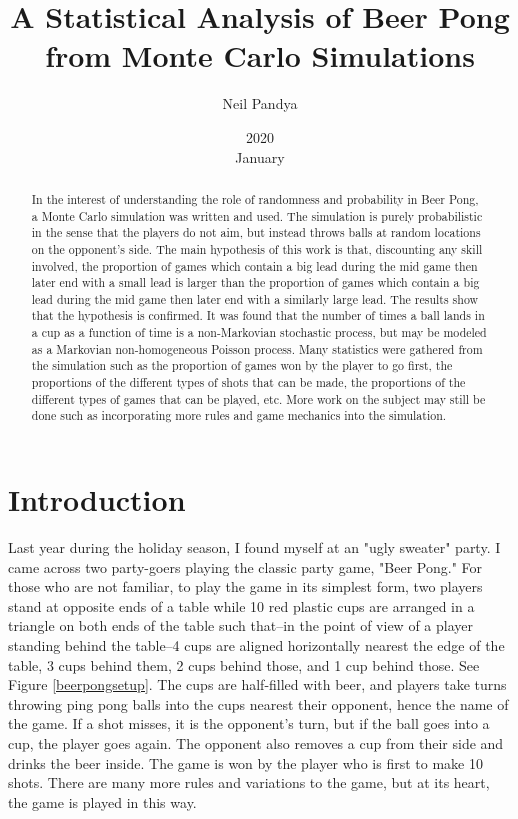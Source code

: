 \documentclass{article}
\title{A Statistical Analysis of Beer Pong from Monte Carlo Simulations}
\date{2020\\ January}
\author{Neil Pandya}
\begin{document}
\maketitle
\tableofcontents
\begin{abstract}
In the interest of understanding the role of randomness and probability in Beer Pong, a Monte Carlo simulation was written and used. The simulation is purely probabilistic in the sense that the players do not aim, but instead throws balls at random locations on the opponent's side. The main hypothesis of this work is that, discounting any skill involved, the proportion of games which contain a big lead during the mid game then later end with a small lead is larger than the proportion of games which contain a big lead during the mid game then later end with a similarly large lead. The results show that the hypothesis is confirmed. It was found that the number of times a ball lands in a cup as a function of time is a non-Markovian stochastic process, but may be modeled as a Markovian non-homogeneous Poisson process. Many statistics were gathered from the simulation such as the proportion of games won by the player to go first, the proportions of the different types of shots that can be made, the proportions of the different types of games that can be played, etc. More work on the subject may still be done such as incorporating more rules and game mechanics into the simulation.
\end{abstract}
\section{Introduction}

Last year during the holiday season, I found myself at an "ugly sweater" party. I came across two party-goers playing the classic party game, "Beer Pong." For those who are not familiar, to play the game in its simplest form, two players stand at opposite ends of a table while 10 red plastic cups are arranged in a triangle on both ends of the table such that--in the point of view of a player standing behind the table--4 cups are aligned horizontally nearest the edge of the table, 3 cups behind them, 2 cups behind those, and 1 cup behind those. See Figure \ref{beerpongsetup}. The cups are half-filled with beer, and players take turns throwing ping pong balls into the cups nearest their opponent, hence the name of the game. If a shot misses, it is the opponent's turn, but if the ball goes into a cup, the player goes again. The opponent also removes a cup from their side and drinks the beer inside. The game is won by the player who is first to make 10 shots. There are many more rules and variations to the game, but at its heart, the game is played in this way.
\end{document}
